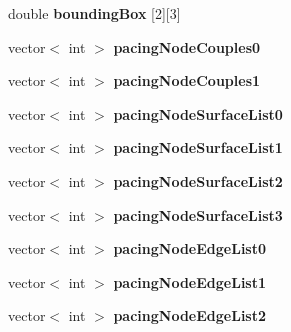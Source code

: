 \begin{DoxyCompactItemize}
\item 
\hypertarget{classSimulation_a8e5b5de0190d35c7984c4b393fd9fcd9}{}double {\bfseries bounding\+Box} \mbox{[}2\mbox{]}\mbox{[}3\mbox{]}\label{classSimulation_a8e5b5de0190d35c7984c4b393fd9fcd9}

\item 
\hypertarget{classSimulation_a4164fd18de78e7c215d8fd34164e9f57}{}vector$<$ int $>$ {\bfseries pacing\+Node\+Couples0}\label{classSimulation_a4164fd18de78e7c215d8fd34164e9f57}

\item 
\hypertarget{classSimulation_a71301ed19ac899b1269460f355ab0d6f}{}vector$<$ int $>$ {\bfseries pacing\+Node\+Couples1}\label{classSimulation_a71301ed19ac899b1269460f355ab0d6f}

\item 
\hypertarget{classSimulation_a217551c21f0d872a258972f371aa54c0}{}vector$<$ int $>$ {\bfseries pacing\+Node\+Surface\+List0}\label{classSimulation_a217551c21f0d872a258972f371aa54c0}

\item 
\hypertarget{classSimulation_a2c1283e8412daa39cd84ddf7c14ec11f}{}vector$<$ int $>$ {\bfseries pacing\+Node\+Surface\+List1}\label{classSimulation_a2c1283e8412daa39cd84ddf7c14ec11f}

\item 
\hypertarget{classSimulation_afa387f640eafdbb1742029f1c8b0752d}{}vector$<$ int $>$ {\bfseries pacing\+Node\+Surface\+List2}\label{classSimulation_afa387f640eafdbb1742029f1c8b0752d}

\item 
\hypertarget{classSimulation_a185e29bd1c8d92480d8448e9ee46f29e}{}vector$<$ int $>$ {\bfseries pacing\+Node\+Surface\+List3}\label{classSimulation_a185e29bd1c8d92480d8448e9ee46f29e}

\item 
\hypertarget{classSimulation_a2834b8c926d53182b069443a0e3da2d4}{}vector$<$ int $>$ {\bfseries pacing\+Node\+Edge\+List0}\label{classSimulation_a2834b8c926d53182b069443a0e3da2d4}

\item 
\hypertarget{classSimulation_afe474f6c0c611852287bb4bb77291da3}{}vector$<$ int $>$ {\bfseries pacing\+Node\+Edge\+List1}\label{classSimulation_afe474f6c0c611852287bb4bb77291da3}

\item 
\hypertarget{classSimulation_a9fab424769ec800a71a14d8aeb702b25}{}vector$<$ int $>$ {\bfseries pacing\+Node\+Edge\+List2}\label{classSimulation_a9fab424769ec800a71a14d8aeb702b25}


\end{DoxyCompactItemize}
